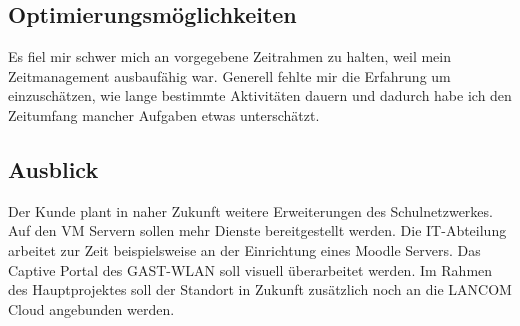 \subsection{Optimierungsmöglichkeiten}
\label{sec:Optimierungsmöglichkeiten}
Es fiel mir schwer mich an vorgegebene Zeitrahmen zu halten, weil mein Zeitmanagement ausbaufähig war. Generell fehlte mir die Erfahrung um einzuschätzen, wie lange bestimmte Aktivitäten dauern und dadurch habe ich den Zeitumfang mancher Aufgaben etwas unterschätzt.


\subsection{Ausblick}
\label{sec:Ausblick}
Der Kunde plant in naher Zukunft weitere Erweiterungen des Schulnetzwerkes. Auf den VM Servern sollen mehr Dienste bereitgestellt werden. Die IT-Abteilung arbeitet zur Zeit beispielsweise an der Einrichtung eines Moodle Servers. Das Captive Portal des GAST-WLAN soll visuell überarbeitet werden. Im Rahmen des Hauptprojektes soll der Standort in Zukunft zusätzlich noch an die LANCOM Cloud angebunden werden. 
\clearpage
\begin{comment}
	\item Wie wird sich das Projekt in Zukunft weiterentwickeln (\zB geplante Erweiterungen)?
\end{comment}
